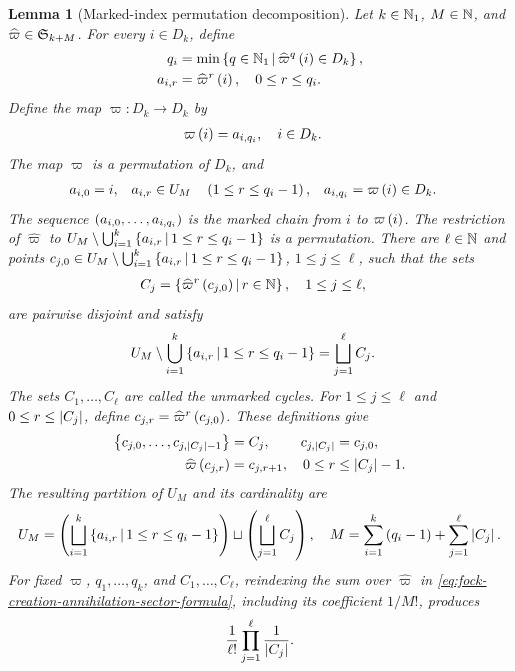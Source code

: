 \documentclass[11pt,a4paper]{article}
\theoremstyle{plain}
\newtheorem{lem}[thm]{Lemma}
\theoremstyle{definition}
\theoremstyle{remark}
\begin{document}
\begin{lem}[Marked-index permutation decomposition]\label{lem:fock-marked-index-permutation-decomposition}
Let $k \in \mathbb{N}_1$, $M \in \mathbb{N}$, and $\widehat{\varpi} \in \grsym{k+M}$.
For every $i \in D_k$, define
$$\begin{aligned}
q_i
& =
\min\left\{q \in \mathbb{N}_1 \, \middle| \, \widehat{\varpi}^{q} \left( i \right) \in D_k\right\},
\\
a_{i,r}
& =
\widehat{\varpi}^{r} \left( i \right),
\quad 0 \leq r \leq q_i.
\end{aligned}$$
Define the map $\varpi \colon D_k \to D_k$ by
$$\begin{aligned}
\varpi \left( i \right)
& =
a_{i,q_i},
\quad i \in D_k.
\end{aligned}$$
The map $\varpi$ is a permutation of $D_k$, and
$$\begin{aligned}
a_{i,0}
& =
i,
&
a_{i,r}
& \in
U_M
\quad
\left( 1 \leq r \leq q_i-1 \right),
&
a_{i,q_i}
& =
\varpi \left( i \right)
\in
D_k.
\end{aligned}$$
The sequence $\left( a_{i,0},\ldots,a_{i,q_i} \right)$ is the marked chain from $i$ to $\varpi \left( i \right)$.
The restriction of $\widehat{\varpi}$ to
$U_M \setminus \bigcup_{i=1}^{k}\left\{a_{i,r} \, \middle| \, 1\leq r\leq q_i-1\right\}$ is a permutation.
There are $\ell \in \mathbb{N}$ and points
$c_{j,0} \in U_M \setminus \bigcup_{i=1}^{k}\left\{a_{i,r} \, \middle| \, 1\leq r\leq q_i-1\right\}$,
$1 \leq j \leq \ell$, such that the sets
$$\begin{aligned}
C_j
& =
\left\{\widehat{\varpi}^{r} \left( c_{j,0} \right) \, \middle| \, r \in \mathbb{N}\right\},
\quad 1 \leq j \leq \ell,
\end{aligned}$$
are pairwise disjoint and satisfy
$$\begin{aligned}
U_M \setminus \bigcup_{i=1}^{k}\left\{a_{i,r} \, \middle| \, 1\leq r\leq q_i-1\right\}
& =
\bigsqcup_{j=1}^{\ell}C_j.
\end{aligned}$$
The sets $C_1,\ldots,C_{\ell}$ are called the unmarked cycles.
For $1 \leq j \leq \ell$ and $0 \leq r \leq \left| C_j \right|$, define
$c_{j,r}=\widehat{\varpi}^{r} \left( c_{j,0} \right)$.
These definitions give
$$\begin{aligned}
\left\{ c_{j,0},\ldots,c_{j,\left| C_j \right|-1} \right\}
& =
C_j,
&
c_{j,\left| C_j \right|}
& =
c_{j,0},
\\
\widehat{\varpi} \left( c_{j,r} \right)
& =
c_{j,r+1},
&
0 \leq r
& \leq
\left| C_j \right|-1.
\end{aligned}$$
The resulting partition of $U_M$ and its cardinality are
$$\begin{aligned}
U_M
=
\left( \bigsqcup_{i=1}^{k}\left\{a_{i,r} \, \middle| \, 1\leq r\leq q_i-1\right\} \right)
\sqcup
\left( \bigsqcup_{j=1}^{\ell}C_j \right),
\quad
M
=
\sum_{i = 1}^{k}\left( q_i-1 \right)
+
\sum_{j = 1}^{\ell}\left| C_j \right|.
\end{aligned}$$
For fixed $\varpi$, $q_1,\ldots,q_k$, and $C_1,\ldots,C_{\ell}$, reindexing the sum over
$\widehat{\varpi}$ in \eqref{eq:fock-creation-annihilation-sector-formula}, including its coefficient
$1/M!$, produces
\begin{equation}
\begin{aligned}
\frac{1}{\ell!}
\prod_{j = 1}^{\ell}\frac{1}{\left| C_j \right|}.
\end{aligned}
\label{eq:fock-marked-index-permutation-coefficient}
\end{equation}
\end{lem}
\end{document}
